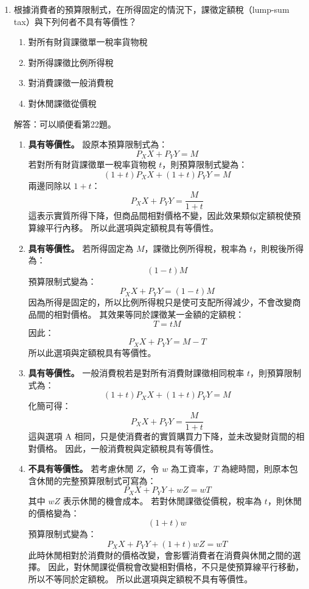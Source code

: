 \documentclass[12pt, a4paper]{article}
\begin{document}
\begin{enumerate}
    \item 根據消費者的預算限制式，在所得固定的情況下，課徵定額稅（lump-sum tax）與下列何者不具有等價性？
    \begin{enumerate}[label=\Alph*.]
        \item 對所有財貨課徵單一稅率貨物稅
        \item 對所得課徵比例所得稅
        \item 對消費課徵一般消費稅
        \item 對休閒課徵從價稅
    \end{enumerate}
    解答：可以順便看第22題。
    \begin{enumerate}[label=\Alph*.]
    \item \textbf{具有等價性。}
    設原本預算限制式為：
    \[
    P_X X + P_Y Y = M
    \]
    若對所有財貨課徵單一稅率貨物稅 \(t\)，則預算限制式變為：
    \[
    (1+t)P_X X + (1+t)P_Y Y = M
    \]
    兩邊同除以 \(1+t\)：
    \[
    P_X X + P_Y Y = \frac{M}{1+t}
    \]
    這表示實質所得下降，但商品間相對價格不變，因此效果類似定額稅使預算線平行內移。
    所以此選項與定額稅具有等價性。
    \item \textbf{具有等價性。}
    若所得固定為 \(M\)，課徵比例所得稅，稅率為 \(t\)，則稅後所得為：
    \[
    (1-t)M
    \]
    預算限制式變為：
    \[
    P_X X + P_Y Y = (1-t)M
    \]
    因為所得是固定的，所以比例所得稅只是使可支配所得減少，不會改變商品間的相對價格。
    其效果等同於課徵某一金額的定額稅：
    \[
    T = tM
    \]
    因此：
    \[
    P_X X + P_Y Y = M - T
    \]
    所以此選項與定額稅具有等價性。
    \item \textbf{具有等價性。}
    一般消費稅若是對所有消費財課徵相同稅率 \(t\)，則預算限制式為：
    \[
    (1+t)P_X X + (1+t)P_Y Y = M
    \]
    化簡可得：
    \[
    P_X X + P_Y Y = \frac{M}{1+t}
    \]
    這與選項 A 相同，只是使消費者的實質購買力下降，並未改變財貨間的相對價格。
    因此，一般消費稅與定額稅具有等價性。
    \item \textbf{不具有等價性。}
    若考慮休閒 \(Z\)，令 \(w\) 為工資率，\(T\) 為總時間，則原本包含休閒的完整預算限制式可寫為：
    \[
    P_X X + P_Y Y + wZ = wT
    \]
    其中 \(wZ\) 表示休閒的機會成本。
    若對休閒課徵從價稅，稅率為 \(t\)，則休閒的價格變為：
    \[
    (1+t)w
    \]
    預算限制式變為：
    \[
    P_X X + P_Y Y + (1+t)wZ = wT
    \]
    此時休閒相對於消費財的價格改變，會影響消費者在消費與休閒之間的選擇。
    因此，對休閒課從價稅會改變相對價格，不只是使預算線平行移動，所以不等同於定額稅。
    所以此選項與定額稅不具有等價性。
    \end{enumerate}


\end{enumerate}
\end{document}
